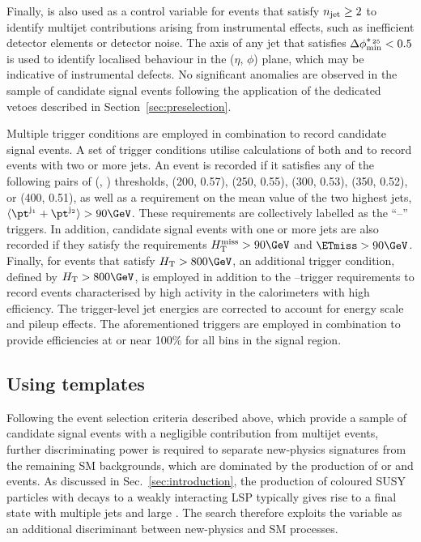 Finally, \bdphimod is also used as a control variable for events that
satisfy $n_{\text{jet}} \geq 2$ to identify multijet contributions arising from
instrumental effects, such as inefficient detector elements or
detector noise. The axis of any jet that satisfies $\Delta\phi^{*_{\, 25}}_\text{min} < 0.5$
is used to identify localised behaviour in the ($\eta$, $\phi$) plane,
which may be indicative of instrumental defects. No significant
anomalies are observed in the sample of candidate signal events
following the application of the dedicated vetoes described in
Section~\ref{sec:preselection}.


{
Multiple trigger conditions are employed in combination to record 
candidate signal events. A set of trigger conditions utilise
calculations of both \scalht and \alphat to record events with two or
more jets. An event is recorded if it satisfies any of the following
pairs of (\scalht [\GeVns{}], \alphat) thresholds, (200, 0.57), (250,
0.55), (300, 0.53), (350, 0.52), or (400, 0.51), as well as a
requirement on the mean value of the two highest \pt jets,
$\langle\pt^{\mathrm{j_1}} + \pt^{\mathrm{j_2}}\rangle >
90\GeV$. These requirements are collectively labelled as the
``\scalht--\alphat'' triggers. In addition, candidate signal events
with one or more jets are also recorded if they satisfy the
requirements $\HTmiss > 90\GeV$ and $\ETmiss > 90\GeV$. Finally, for
events that satisfy $\scalht > 800\GeV$, an additional trigger
condition, defined by $\scalht > 800\GeV$, is employed in addition to
the \scalht--\alphat trigger requirements to record events
characterised by high activity in the calorimeters with high
efficiency. The trigger-level jet energies are corrected to account
for energy scale and pileup effects. The aforementioned triggers are
employed in combination to provide efficiencies at or near 100\% for
all bins in the signal region.
\par}


\subsection{Using \texorpdfstring{\HTmiss}{HTmiss} templates}
\label{sec:mht_templates}

Following the event selection criteria described above, which provide
a sample of candidate signal events with a negligible contribution
from multijet events, further discriminating power is required to
separate new-physics signatures from the remaining SM backgrounds,
which are dominated by the production of \ttbar or \wlj and \znunuj
events. As discussed in Sec.~\ref{sec:introduction}, the production of
coloured SUSY particles with decays to a weakly interacting LSP
typically gives rise to a final state with multiple jets and large
\ptvecmiss. The search therefore exploits the \HTmiss variable as an
additional discriminant between new-physics and SM processes.

